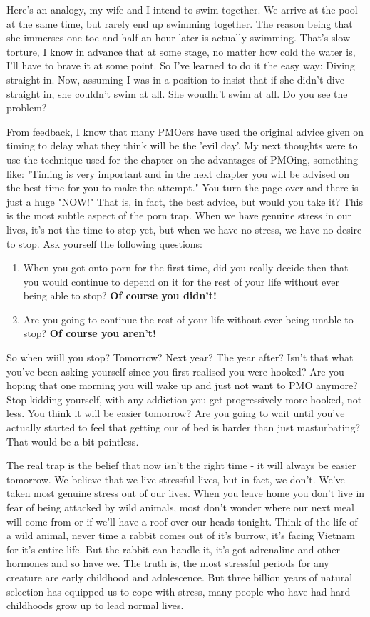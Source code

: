\documentclass[easypeasy.tex]{subfiles}
\begin{document}
Here's an analogy, my wife and I intend to swim together. We arrive at the pool at the same time, but rarely end up swimming together. The reason being that she immerses one toe and half an hour later is actually swimming. That's slow torture, I know in advance that at some stage, no matter how cold the water is, I'll have to brave it at some point. So I've learned to do it the easy way: Diving straight in. Now, assuming I was in a position to insist that if she didn't dive straight in, she couldn't swim at all. She woudln't swim at all. Do you see the problem?

From feedback, I know that many PMOers have used the original advice given on timing to delay what they think will be the 'evil day'. My next thoughts were to use the technique used for the chapter on the advantages of PMOing, something like: "Timing is very important and in the next chapter you will be advised on the best time for you to make the attempt." You turn the page over and there is just a huge "NOW!" That is, in fact, the best advice, but would you take it? This is the most subtle aspect of the porn trap. When we have genuine stress in our lives, it's not the time to stop yet, but when we have no stress, we have no desire to stop. Ask yourself the following questions:
\begin{enumerate}
  \item When you got onto porn for the first time, did you really decide then that you would continue to depend on it for the rest of your life without ever being able to stop? \textbf{Of course you didn't!}

  \item Are you going to continue the rest of your life without ever being unable to stop? \textbf{Of course you aren't!}
  \end{enumerate}
So when wiill you stop? Tomorrow? Next year? The year after? Isn't that what you've been asking yourself since you first realised you were hooked? Are you hoping that one morning you will wake up and just not want to PMO anymore? Stop kidding yourself, with any addiction you get progressively more hooked, not less. You think it will be easier tomorrow? Are you going to wait until you've actually started to feel that getting our of bed is harder than just masturbating? That would be a bit pointless.

The real trap is the belief that now isn't the right time - it will always be easier tomorrow. We believe that we live stressful lives, but in fact, we don't. We've taken most genuine stress out of our lives. When you leave home you don't live in fear of being attacked by wild animals, most don't wonder where our next meal will come from or if we'll have a roof over our heads tonight. Think of the life of a wild animal, never time a rabbit comes out of it's burrow, it's facing Vietnam for it's entire life. But the rabbit can handle it, it's got adrenaline and other hormones and so have we. The truth is, the most stressful periods for any creature are early childhood and adolescence. But three billion years of natural selection has equipped us to cope with stress, many people who have had hard childhoods grow up to lead normal lives.
\end{document}
